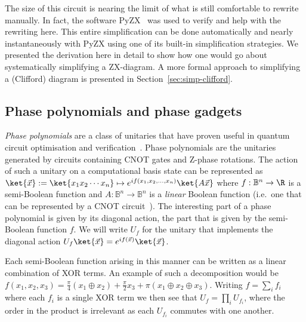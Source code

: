 \documentclass[a4paper,onecolumn,superscriptaddress,11pt,%
				unpublished,%
				allowfontchageintitle,%
				]{quantumarticle}
\begin{document}
The size of this circuit is nearing the limit of what is still comfortable to rewrite manually. In fact, the software PyZX~\cite{pyzx} was used to verify and help with the rewriting here. This entire simplification can be done automatically and nearly instantaneously with PyZX using one of its built-in simplification strategies. We presented the derivation here in detail to show how one would go about systematically simplifying a ZX-diagram.
A more formal approach to simplifying a (Clifford) diagram is presented in Section~\ref{sec:simp-clifford}.

\subsection{Phase polynomials and phase gadgets}\label{sec:phase-polynomial}

\emph{Phase polynomials} are a class of unitaries that have proven useful in quantum circuit optimisation and verification~\cite{amy2016t,AmyVerification,amy2018cnot,heyfron2018efficient}.
Phase polynomials are the unitaries generated by circuits containing CNOT gates and Z-phase rotations. The action of such a unitary on a computational basis state can be represented as $\ket{\vec{x}} := \ket{x_1x_2\cdots x_n} \mapsto e^{if(x_1,x_2,\ldots,x_n)}\ket{A\vec{x}}$ where $f:\mathbb{B}^n\rightarrow \R$ is a semi-Boolean function and $A:\mathbb{B}^n\rightarrow \mathbb{B}^n$ is a \emph{linear} Boolean function (i.e.~one that can be represented by a CNOT circuit~\cite{markov2008optimal}).
The interesting part of a phase polynomial is given by its diagonal action, the part that is given by the semi-Boolean function $f$. We will write $U_f$ for the unitary that implements the diagonal action $U_f\ket{\vec{x}} = e^{if(\vec{x})}\ket{\vec{x}}$.

Each semi-Boolean function arising in this manner can be written as a linear combination of XOR terms. An example of such a decomposition would be $f(x_1,x_2,x_3) = \frac{\pi}{4}(x_1\oplus x_2) + \frac{\pi}{2}x_3 + \pi(x_1\oplus x_2\oplus x_3)$. Writing $f=\sum_i f_i$ where each $f_i$ is a single XOR term we then see that $U_f = \prod_i U_{f_i}$, where the order in the product is irrelevant as each $U_{f_i}$ commutes with one another.
\end{document}
